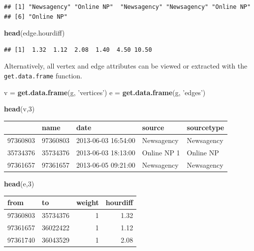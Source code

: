 \documentclass[]{article}
\newenvironment{Shaded}{\begin{snugshade}}{\end{snugshade}}
\newcommand{\KeywordTok}[1]{\textcolor[rgb]{0.13,0.29,0.53}{\textbf{{#1}}}}
\newcommand{\DecValTok}[1]{\textcolor[rgb]{0.00,0.00,0.81}{{#1}}}
\newcommand{\StringTok}[1]{\textcolor[rgb]{0.31,0.60,0.02}{{#1}}}
\newcommand{\NormalTok}[1]{{#1}}
\begin{document}
\begin{verbatim}
## [1] "Newsagency" "Online NP"  "Newsagency" "Newsagency" "Online NP" 
## [6] "Online NP"
\end{verbatim}

\begin{Shaded}
\begin{Highlighting}[]
\KeywordTok{head}\NormalTok{(edge.hourdiff)}
\end{Highlighting}
\end{Shaded}

\begin{verbatim}
## [1]  1.32  1.12  2.08  1.40  4.50 10.50
\end{verbatim}

Alternatively, all vertex and edge attributes can be viewed or extracted
with the \texttt{get.data.frame} function.

\begin{Shaded}
\begin{Highlighting}[]
\NormalTok{v =}\StringTok{ }\KeywordTok{get.data.frame}\NormalTok{(g, }\StringTok{'vertices'}\NormalTok{)}
\NormalTok{e =}\StringTok{ }\KeywordTok{get.data.frame}\NormalTok{(g, }\StringTok{'edges'}\NormalTok{)}

\KeywordTok{head}\NormalTok{(v,}\DecValTok{3}\NormalTok{)}
\end{Highlighting}
\end{Shaded}

\begin{longtable}[c]{@{}lllll@{}}
\toprule
& name & date & source & sourcetype\tabularnewline
\midrule
\endhead
97360803 & 97360803 & 2013-06-03 16:54:00 & Newsagency &
Newsagency\tabularnewline
35734376 & 35734376 & 2013-06-03 18:13:00 & Online NP 1 & Online
NP\tabularnewline
97361657 & 97361657 & 2013-06-05 09:21:00 & Newsagency &
Newsagency\tabularnewline
\bottomrule
\end{longtable}

\begin{Shaded}
\begin{Highlighting}[]
\KeywordTok{head}\NormalTok{(e,}\DecValTok{3}\NormalTok{)    }
\end{Highlighting}
\end{Shaded}

\begin{longtable}[c]{@{}llrr@{}}
\toprule
from & to & weight & hourdiff\tabularnewline
\midrule
\endhead
97360803 & 35734376 & 1 & 1.32\tabularnewline
97361657 & 36022422 & 1 & 1.12\tabularnewline
97361740 & 36043529 & 1 & 2.08\tabularnewline
\bottomrule
\end{longtable}
\end{document}
